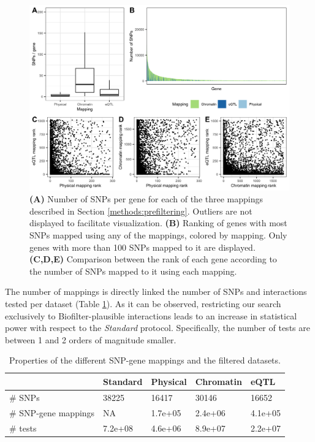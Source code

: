 \documentclass[
  11pt,
]{env/yjiao}
\begin{document}
\begin{figure}
\centering
\includegraphics{fig/mappings_per_gene.png}
\caption{\label{fig:snps-per-mapping}\textbf{(A)} Number of SNPs per gene for each of the three mappings described in Section \ref{methods:prefiltering}. Outliers are not displayed to facilitate visualization. \textbf{(B)} Ranking of genes with most SNPs mapped using any of the mappings, colored by mapping. Only genes with more than 100 SNPs mapped to it are displayed. \textbf{(C,D,E)} Comparison between the rank of each gene according to the number of SNPs mapped to it using each mapping.}
\end{figure}

The number of mappings is directly linked the number of SNPs and
interactions tested per dataset (Table \ref{tab:datasets-snps}). As it can be
observed, restricting our search exclusively to Biofilter-plausible interactions
leads to an increase in statistical power with respect to the \emph{Standard}
protocol. Specifically, the number of tests are between 1 and 2 orders of
magnitude smaller.

\begin{table}

\caption{\label{tab:datasets-snps}Properties of the different SNP-gene mappings and the filtered datasets.}
\centering
\begin{tabular}[t]{lllll}
\toprule
 & Standard & Physical & Chromatin & eQTL\\
\midrule
\rowcolor{gray!6}  \# SNPs & 38225 & 16417 & 30146 & 16652\\
\# SNP-gene mappings & NA & 1.7e+05 & 2.4e+06 & 4.1e+05\\
\rowcolor{gray!6}  \# tests & 7.2e+08 & 4.6e+06 & 8.9e+07 & 2.2e+07\\
\bottomrule
\end{tabular}
\end{table}
\end{document}
